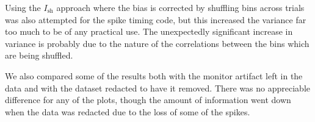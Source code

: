 Using the $I_{\text{sh}}$ approach where the bias is corrected by shuffling bins across trials \citep{Montemurro2007} was also attempted for the spike timing code, but this increased the variance far too much to be of any practical use.
The unexpectedly significant increase in variance is probably due to the nature of the correlations between the bins which are being shuffled.

We also compared some of the results both with the monitor artifact left in the data and with the dataset redacted to have it removed.
There was no appreciable difference for any of the plots, though the amount of information went down when the data was redacted due to the loss of some of the spikes.
